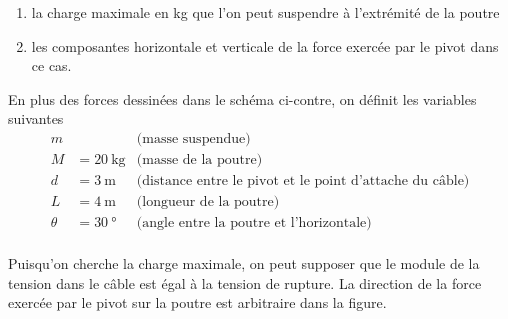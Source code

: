 \documentclass{tufte-handout}
\begin{document}
\begin{enumerate}
  \item la charge maximale en kg que l'on peut suspendre à l'extrémité de la poutre
  \item les composantes horizontale et verticale de la force exercée par le
    pivot dans ce
cas.
\end{enumerate}


\begin{marginfigure}
  \begin{center}
  \end{center}
\end{marginfigure}

En plus des forces dessinées dans le schéma ci-contre, on définit les variables
suivantes
\begin{align*}
  m &  & \text{(masse suspendue)} \\
  M &= \SI{20}{\kilogram}  & \text{(masse de la poutre)} \\ 
  d &= \SI{3}{\meter}  & \text{(distance entre le pivot et le point d'attache
    du câble)} \\ 
  L &= \SI{4}{\meter}  & \text{(longueur de la poutre)} \\ 
  \theta &= \SI{30}{\degree}  & \text{(angle entre la poutre et l'horizontale)} \\ 
\end{align*}

Puisqu'on cherche la charge maximale, on peut supposer que le module de la
tension dans le câble est égal à la tension de rupture.  La direction de la
force exercée par le pivot sur la poutre est arbitraire dans la figure.
\end{document}
